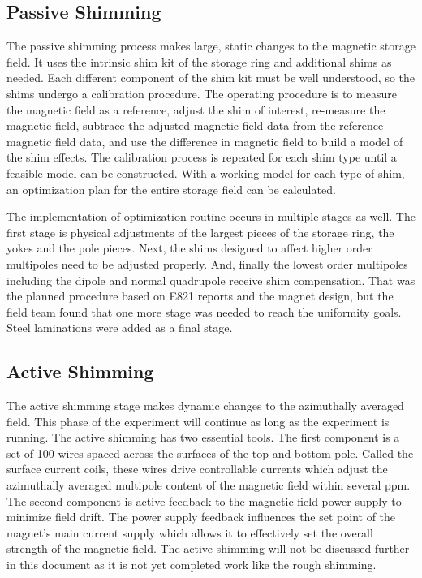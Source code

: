 \subsection{Passive Shimming}
The passive shimming process makes large, static changes to the magnetic storage field.  It uses the intrinsic shim kit of the storage ring and additional shims as needed. Each different component of the shim kit must be well understood, so the shims undergo a calibration procedure.  The operating procedure is to measure the magnetic field as a reference, adjust the shim of interest, re-measure the magnetic field, subtrace the adjusted magnetic field data from the reference magnetic field data, and use the difference in magnetic field to build a model of the shim effects.  The calibration process is repeated for each shim type until a feasible model can be constructed.  With a working model for each type of shim, an optimization plan for the entire storage field can be calculated.

The implementation of optimization routine occurs in multiple stages as well.  The first stage is physical adjustments of the largest pieces of the storage ring, the yokes and the pole pieces.  Next, the shims designed to affect higher order multipoles need to be adjusted properly.  And, finally the lowest order multipoles including the dipole and normal quadrupole receive shim compensation.  That was the planned procedure based on E821 reports and the magnet design, but the field team found that one more stage was needed to reach the uniformity goals.  Steel laminations were added as a final stage.

\subsection{Active Shimming}
The active shimming stage makes dynamic changes to the azimuthally averaged field.  This phase of the experiment will continue as long as the experiment is running.  The active shimming has two essential tools.  The first component is a set of 100 wires spaced across the surfaces of the top and bottom pole.  Called the surface current coils, these wires drive controllable currents which adjust the azimuthally averaged multipole content of the magnetic field within several ppm.  The second component is active feedback to the magnetic field power supply to minimize field drift.  The power supply feedback influences the set point of the magnet's main current supply which allows it to effectively set the overall strength of the magnetic field.  The active shimming will not be discussed further in this document as it is not yet completed work like the rough shimming.

